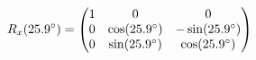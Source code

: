 \documentclass[preview]{standalone}
\begin{document}
\begin{align*}
\special{dvisvgm:raw <g id='unique000'>}R_x(25.9^\circ) = \begin{pmatrix} 1 & 0 & 0 \\ 0 & \cos(25.9^\circ) & -\sin(25.9^\circ) \\ 0 & \sin(25.9^\circ) & \cos(25.9^\circ) \end{pmatrix}\special{dvisvgm:raw </g>}
\end{align*}
\end{document}
